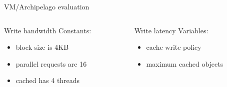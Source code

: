 \begin{frame}{VM/Archipelago evaluation}
	\begin{columns}[t]
		\begin{column}{.5\textwidth}
			Write bandwidth
			Constants:
			\begin{itemize}
				\item block size is 4KB
				\item parallel requests are 16
				\item cached has 4 threads
			\end{itemize}
		\end{column}
		\begin{column}{.5\textwidth}
			Write latency
			Variables:
			\begin{itemize}
				\item cache write policy
				\item maximum cached objects

\end{itemize}
\end{column}
\end{columns}
\end{frame}
